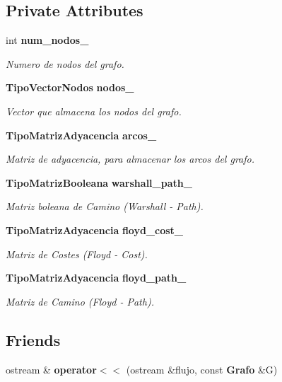 \subsection*{Private Attributes}
\begin{CompactItemize}
\item 
int {\bf num\_\-nodos\_\-}
\begin{CompactList}\small\item\em Numero de nodos del grafo. \item\end{CompactList}\item 
{\bf TipoVectorNodos} {\bf nodos\_\-}
\begin{CompactList}\small\item\em Vector que almacena los nodos del grafo. \item\end{CompactList}\item 
{\bf TipoMatrizAdyacencia} {\bf arcos\_\-}
\begin{CompactList}\small\item\em Matriz de adyacencia, para almacenar los arcos del grafo. \item\end{CompactList}\item 
{\bf TipoMatrizBooleana} {\bf warshall\_\-path\_\-}
\begin{CompactList}\small\item\em Matriz boleana de Camino (Warshall - Path). \item\end{CompactList}\item 
{\bf TipoMatrizAdyacencia} {\bf floyd\_\-cost\_\-}
\begin{CompactList}\small\item\em Matriz de Costes (Floyd - Cost). \item\end{CompactList}\item 
{\bf TipoMatrizAdyacencia} {\bf floyd\_\-path\_\-}
\begin{CompactList}\small\item\em Matriz de Camino (Floyd - Path). \item\end{CompactList}\end{CompactItemize}
\subsection*{Friends}
\begin{CompactItemize}
\item 
ostream \& {\bf operator$<$$<$} (ostream \&flujo, const {\bf Grafo} \&G)
\end{CompactItemize}


